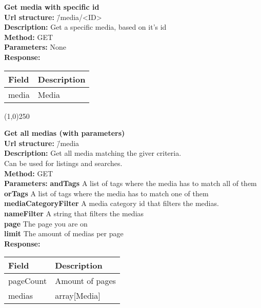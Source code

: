 \documentclass[11pt]{article}
\begin{document}
\begin{tabbing}
\textbf{Get media with specific id} \\
\textcolor{black!60}{\textbf{Url structure:}} \hspace{0.2in} \= /media/<ID> \\
\textcolor{black!60}{\textbf{Description:}}  \> Get a specific media, based on it's id \\
\textcolor{black!60}{\textbf{Method:}} \> GET \\
\textcolor{black!60}{\textbf{Parameters:}} \> None \\
\textcolor{black!60}{\textbf{Response:}} \\ \>
\begin{tabular}{|l|l|}
\hline
 Field  &  Description  \\
\hline
 media  &  Media        \\
\hline
\end{tabular}
\end{tabbing}

\begin{center}\line(1,0){250}\end{center}

\begin{tabbing}
\textbf{Get all medias (with parameters)} \\
\textcolor{black!60}{\textbf{Url structure:}} \hspace{0.2in} \= /media \\
\textcolor{black!60}{\textbf{Description:}}  \> Get all media matching the giver criteria. \\ \> Can be used for listings and searches. \\
\textcolor{black!60}{\textbf{Method:}} \> GET \\
\textcolor{black!60}{\textbf{Parameters:}} \> \textbf{andTags} A list of tags where the media has to match all of them \\
\> \textbf{orTags} A list of tags where the media has to match one of them \\
\> \textbf{mediaCategoryFilter} A media category id that filters the medias. \\
\> \textbf{nameFilter} A string that filters the medias \\
\> \textbf{page} The page you are on \\
\> \textbf{limit} The amount of medias per page \\
\textcolor{black!60}{\textbf{Response:}} \\ \>
\begin{tabular}{|l|l|}
\hline
 Field      &  Description      \\
\hline
 pageCount  &  Amount of pages  \\
 medias     &  array[Media]     \\
\hline
\end{tabular}
\end{tabbing}
\end{document}
